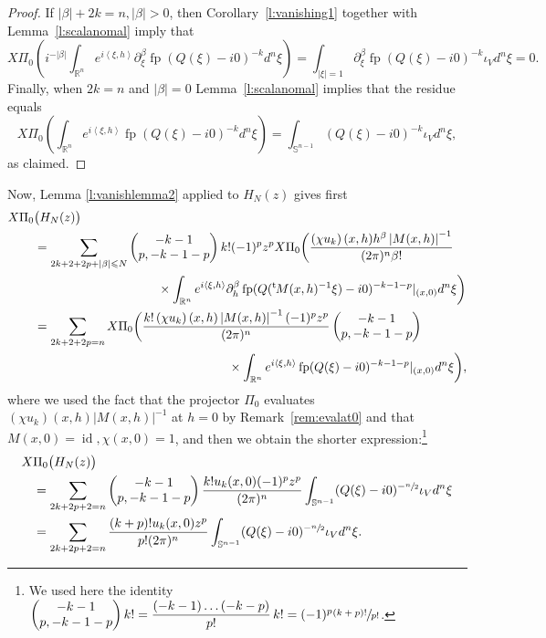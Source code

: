 \documentclass[10pt]{amsart}
\theoremstyle{definition}
\let\euler X
\let\Feuler V
\DeclareMathOperator\id{id}
\DeclareMathOperator*{\pf}{fp}
\newcommand{\module}[1]{\left|#1\right|}
\renewcommand{\t}{{{}^{\mathrm{t}\mkern-2mu}}}
\begin{document}
\begin{proof}
If $\vert \beta\vert+2k=n, \vert\beta\vert>0$, then {Corollary}~\ref{l:vanishing1} together with Lemma~\ref{l:scalanomal} imply that
\[
\euler\Pi_0\left(i^{-\vert\beta\vert} \int_{\mathbb{R}^n} e^{i\left\langle\xi,h\right\rangle} \partial_\xi^\beta \pf(Q(\xi)-i0)^{-k} d^n\xi \right)
= \int_{\vert \xi\vert=1} \partial_\xi^\beta \pf(Q(\xi)-i0)^{-k} \iota_\Feuler d^n\xi =0.
\]
Finally, when $2k=n$ and $\vert\beta\vert=0$ Lemma~\ref{l:scalanomal} implies that
the residue equals
\[
\euler\Pi_0\left(\int_{\mathbb{R}^n} e^{i\left\langle\xi,h\right\rangle} \pf(Q(\xi)-i0)^{-k} d^n\xi \right)=\int_{\mathbb{S}^{n-1}}
(Q(\xi)-i0)^{-k} \iota_\Feuler d^n\xi,
\]
as claimed.
\end{proof}

Now, Lemma \ref{l:vanishlemma2} applied to $H_N(z)$ gives first
\[
\begin{aligned}
\euler\Pi_0 &\big(H_N(z)\big)\\
&=\sum_{2k+2+2p+\vert \beta\vert\leqslant N}\begin{pmatrix}
-k-1\\
p,-k-1-p
\end{pmatrix} k! {(-1)^p} z^p
\euler\Pi_0\biggl(\frac{\left(\chi u_k\right)(x,h)h^\beta\module{M(x,h)}^{-1}}{(2\pi)^n\beta !}\\
&\hspace*{3.5cm}\times\int_{\mathbb{R}^n}e^{i\left\langle\xi,h\right\rangle}
\partial^\beta_h \pf(Q(\t M(x, h)^{-1}\xi)-i0)^{-k-1-p}|_{(x,0)}d^n\xi\biggr)
\\
&=
\sum_{2k+2+2p=n }
\euler\Pi_0\bigg(\frac{k!\left(\chi u_k\right)(x,h)\module{M(x,h)}^{-1}{(-1)^p} z^p}{(2\pi)^n} \begin{pmatrix}
-k-1\\
p,-k-1-p
\end{pmatrix}\\
&\hspace*{5.5cm}\times \int_{\mathbb{R}^n}e^{i\left\langle\xi,h\right\rangle}
\pf(Q(\xi)-i0)^{-k-1-p}|_{(x,0)}d^n\xi\bigg),
\end{aligned}
\]
where we used the fact that the projector $\Pi_0$ evaluates $\left(\chi u_k\right)(x,h)\module{M(x,h)}^{-1}$ at $h=0$ by Remark~\ref{rem:evalat0} and that $M(x,0)=\id, \chi(x,0)=1$, and then we obtain the shorter expression:\footnote{We used here the identity
$\begin{pmatrix}
-k-1\\
p,-k-1-p
\end{pmatrix} k!= \dfrac{(-k-1)\dots (-k-p) }{p!}\,k!=(-1)^p\sfrac{(k+p)!}{p!} $.}
\begin{align}
\euler&\Pi_0 \big(H_N(z)\big)\notag\\\label{eq:shorter}
&=\sum_{2k+2p+2=n } \begin{pmatrix}
-k-1\\
p,-k-1-p
\end{pmatrix}
\frac{k!u_k(x,0){(-1)^p}z^p}{(2\pi)^n}\int_{\mathbb{S}^{n-1}}
(Q(\xi)-i0)^{-\sfrac{n}{2}} \iota_\Feuler d^n\xi\\
&=\sum_{2k+2p+2=n }
\frac{(k+p)!u_k(x,0)z^p}{p!(2\pi)^n}\int_{\mathbb{S}^{n-1}}
(Q(\xi)-i0)^{-\sfrac{n}{2}} \iota_\Feuler d^n\xi.\notag
\end{align}
\end{document}
